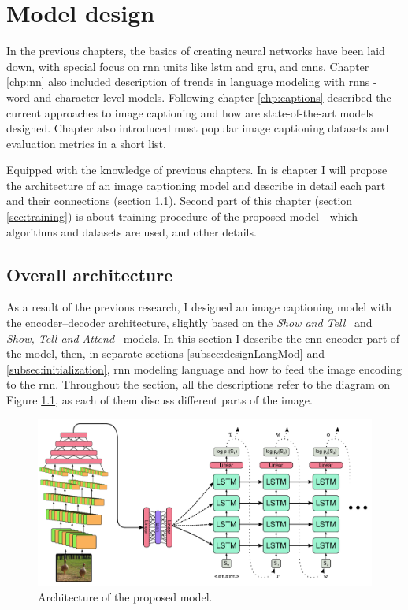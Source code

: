 \chapter{Model design}\label{chp:design}

In the previous chapters, the basics of creating neural networks have been laid down, with special focus on \gls{rnn} units like \gls{lstm} and \gls{gru}, and \gls{cnn}s. Chapter \ref{chp:nn} also included description of trends in language modeling with \gls{rnn}s - word and character level models. Following chapter \ref{chp:captions} described the current approaches to image captioning and how are state-of-the-art models designed. Chapter also introduced most popular image captioning datasets and evaluation metrics in a short list.

Equipped with the knowledge of previous chapters. In is chapter I will propose the architecture of an image captioning model and describe in detail each part and their connections (section \ref{sec:overallArch}). Second part of this chapter (section \ref{sec:training}) is about training procedure of the proposed model - which algorithms and datasets are used, and other details.

\section{Overall architecture} \label{sec:overallArch}

As a result of the previous research, I designed an image captioning model with the encoder--decoder architecture, slightly based on the \emph{Show and Tell}~\cite{DBLP:journals/corr/VinyalsTBE14}  and \emph{Show, Tell and Attend}~\cite{DBLP:journals/corr/XuBKCCSZB15} models. In this section I describe the \gls{cnn} encoder part of the model, then, in separate sections \ref{subsec:designLangMod} and \ref{subsec:initialization}, \gls{rnn} modeling language and how to feed the image encoding to the \gls{rnn}. Throughout the section, all the descriptions refer to the diagram on Figure \ref{fig:proposedModel}, as each of them discuss different parts of the image.

\begin{figure}[!t]
	\centering
	\includegraphics[width=\textwidth]{./fig/proposed-model.pdf}
	\caption{Architecture of the proposed model.
		\label{fig:proposedModel}}
\end{figure}

